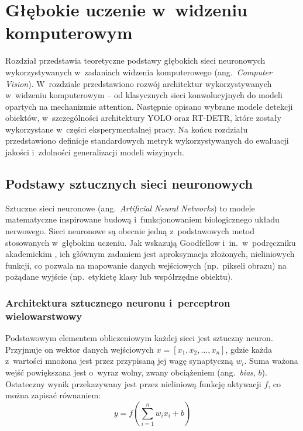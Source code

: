 \chapter{Głębokie uczenie w~widzeniu komputerowym}

Rozdział przedstawia teoretyczne podstawy głębokich sieci neuronowych wykorzystywanych w~zadaniach widzenia komputerowego (ang.\ \emph{Computer Vision}). W~rozdziale przedstawiono rozwój architektur wykorzystywanych w~widzeniu komputerowym – od klasycznych sieci konwolucyjnych do modeli opartych na mechanizmie attention. Następnie opisano wybrane modele detekcji obiektów, w~szczególności architektury YOLO oraz RT-DETR, które zostały wykorzystane w~części eksperymentalnej pracy. Na końcu rozdziału przedstawiono definicje standardowych metryk wykorzystywanych do ewaluacji jakości i~zdolności generalizacji modeli wizyjnych.

\section{Podstawy sztucznych sieci neuronowych}

Sztuczne sieci neuronowe (ang.\ \emph{Artificial Neural Networks}) to modele matematyczne inspirowane budową i~funkcjonowaniem biologicznego układu nerwowego. Sieci neuronowe są obecnie jedną z~podstawowych metod stosowanych w~głębokim uczeniu. Jak wskazują Goodfellow i~in.\ w~podręczniku akademickim \cite{Goodfellow2016}, ich głównym zadaniem jest aproksymacja złożonych, nieliniowych funkcji, co pozwala na mapowanie danych wejściowych (np.\ pikseli obrazu) na pożądane wyjście (np.\ etykietę klasy lub współrzędne obiektu).

\subsection{Architektura sztucznego neuronu i~perceptron wielowarstwowy}

Podstawowym elementem obliczeniowym każdej sieci jest sztuczny neuron. Przyjmuje on wektor danych wejściowych $x = [x_1, x_2, \dots, x_n]$, gdzie każda z~wartości mnożona jest przez przypisaną jej wagę synaptyczną $w_i$. Suma ważona wejść powiększana jest o~wyraz wolny, zwany obciążeniem (ang.\ \emph{bias}, $b$). Ostateczny wynik przekazywany jest przez nieliniową funkcję aktywacji $f$, co można zapisać równaniem:
\begin{equation}
y = f\left(\sum_{i=1}^{n} w_i x_i + b\right)
\end{equation}

